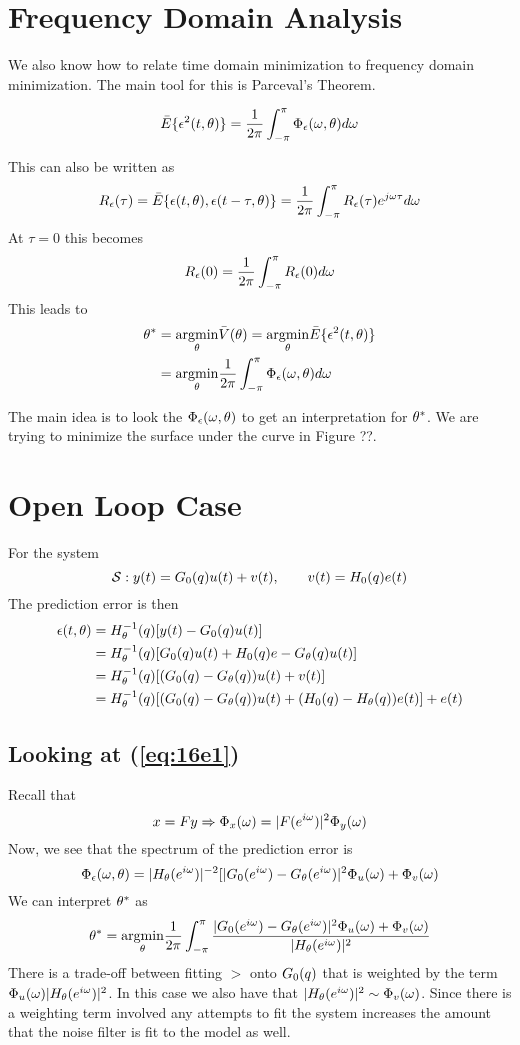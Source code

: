 \section{Frequency Domain Analysis}
We also know how to relate time domain minimization to frequency domain minimization. The main tool for this is Parceval's Theorem.
\begin{theorem}
$$\bar{E}\{\epsilon^2(t,\theta)\} = \frac{1}{2\pi}\int_{-\pi}^\pi \Phi_\epsilon(\omega,\theta)d\omega$$
\end{theorem}
This can also be written as
$$R_\epsilon(\tau) = \bar{E}\{\epsilon(t,\theta),\epsilon(t-\tau,\theta)\} = \frac{1}{2\pi}\int_{-\pi}^\pi R_\epsilon(\tau)e^{j\omega\tau}d\omega$$
At $\tau=0$ this becomes
$$R_\epsilon(0) = \frac{1}{2\pi}\int_{-\pi}^\pi R_\epsilon(0)d\omega$$
This leads to
\begin{align*}
\theta^\ast &= \underset{\theta}{\operatorname{argmin}}\bar{V}(\theta) = \underset{\theta}{\operatorname{argmin}}\bar{E}\{\epsilon^2(t,\theta)\} \\
&= \underset{\theta}{\operatorname{argmin}}\frac{1}{2\pi}\int_{-\pi}^\pi \Phi_\epsilon(\omega,\theta)d\omega
\end{align*}

The main idea is to look the $\Phi_\epsilon(\omega,\theta)$ to get an interpretation for $\theta^\ast$. We are trying to minimize the surface under the curve in Figure ??.

\section{Open Loop Case}
For the system
$$\mathcal{S}: y(t) = G_0(q) u(t) + v(t), \qquad v(t) = H_0(q) e(t)$$
The prediction error is then
\begin{align}
\epsilon(t,\theta) &= H_\theta^{-1}(q)[y(t)-G_0(q) u(t)] \nonumber \\
&= H_\theta^{-1}(q)[G_0(q) u(t)+H_0(q) e-G_\theta(q) u(t)] \nonumber \\
\label{eq:16e1}
&= H_\theta^{-1}(q)[(G_0(q)-G_\theta(q))u(t)+v(t)] \\
\label{eq:16e2}
&= H_\theta^{-1}(q) [ (G_0(q) - G_\theta(q)) u(t) + (H_0(q) - H_\theta(q)) e(t) ] + e(t)
\end{align}

\subsection{Looking at (\ref{eq:16e1})}
Recall that
$$x=Fy \Rightarrow \Phi_x(\omega)=|F(e^{i\omega})|^2\Phi_y(\omega)$$
Now, we see that the spectrum of the prediction error is
$$\Phi_\epsilon(\omega,\theta) = |H_\theta(e^{i\omega})|^{-2}[|G_0(e^{i\omega})-G_\theta(e^{i\omega})|^2\Phi_u(\omega) + \Phi_v(\omega)$$
We can interpret $\theta^\ast$ as
$$\theta^\ast = \underset{\theta}{\operatorname{argmin}} \frac{1}{2\pi} \int_{-\pi}^\pi \frac{|G_0(e^{i\omega})-G_\theta(e^{i\omega})|^2\Phi_u(\omega)+\Phi_v(\omega)}{|H_\theta(e^{i\omega})|^2}$$
There is a trade-off between fitting $\gt$ onto $G_0(q)$ that is weighted by the term $\Phi_u(\omega)|H_\theta(e^{i\omega})|^2$. In this case we also have that $|H_\theta(e^{i\omega})|^2\sim\Phi_v(\omega)$. Since there is a weighting term involved any attempts to fit the system increases the amount that the noise filter is fit to the model as well.


